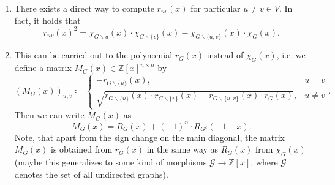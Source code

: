 \documentclass[a4paper,12pt]{article}
\begin{document}
\begin{enumerate}
\item 
There exists a direct way to compute $r_{uv}(x)$ for particular $u \neq v \in V$. In fact, it holds that
$$
r_{uv}(x)^2 = \chi_{G\backslash u}(x)\cdot \chi_{G\backslash\{v\}}(x) - \chi_{G\backslash\{u,v\}}(x)\cdot\chi_G(x).
$$

\item 
This can be carried out to the polynomial $r_G(x)$ instead of $\chi_G(x)$, i.e. we define a matrix $M_G(x) \in \mathbb{Z}[x]^{n \times n}$ by
$$
\left(M_G(x)\right)_{u,v} \coloneqq \begin{cases}
-r_{G\backslash\{u\}}(x), &u = v\\
\sqrt{r_{G\backslash\{u\}}(x) \cdot r_{G\backslash\{v\}}(x) - r_{G\backslash \{u,v\}}(x) \cdot r_G(x)}, &u \neq v
\end{cases}.
$$
Then we can write $M_G(x)$ as
$$
M_G(x) = R_G(x) + (-1)^n \cdot R_{G^c}(-1-x).
$$
Note, that apart from the sign change on the main diagonal, the matrix $M_G(x)$ is obtained from $r_G(x)$ in the same way as $R_G(x)$ from $\chi_G(x)$ (maybe this generalizes to some kind of morphisms $\mathcal{G}\to\mathbb{Z}[x]$, where $\mathcal{G}$ denotes the set of all undirected graphs).
\end{enumerate}


\end{document}
